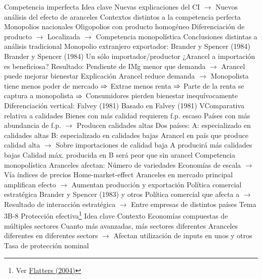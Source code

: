 \documentclass{nuevotema}
\begin{document}
\begin{esquemal}
				\4[] 
		\2 Competencia imperfecta
			\3 Idea clave
				\4 Nuevas explicaciones del CI
				\4[] $\to$ Nuevos análisis del efecto de aranceles
				\4 Contextos distintos a la competencia perfecta
				\4[] Monopolios nacionales
				\4[] Oligopolios con producto homogéneo
				\4[] Diferenciación de producto
				\4[] $\to$ Localizada
				\4[] $\to$ Competencia monopolística
				\4 Conclusiones distintas a análisis tradicional
			\3 Monopolio extranjero exportador: Brander y Spencer (1984)
				\4 Brander y Spencer (1984)
				\4 Un sólo importador/productor
				\4[] ¿Arancel a importación es beneficiosa?
				\4 Resultado:
				\4[] Pendiente de IMg menor que demanda
				\4[] $\to$ Arancel puede mejorar bienestar
				\4 Explicación
				\4[] Arancel reduce demanda
				\4[] $\to$ Monopolista tiene menos poder de mercado
				\4[] $\then$ Extrae menos renta
				\4[] $\then$ Parte de la renta se captura a monopolista
				\4[] $\then$ Consumidores pierden bienestar inequívocamente
			\3 Diferenciación vertical: Falvey (1981)
				\4 Basado en Falvey (1981)
				\4[] VComparativa relativa a calidades
				\4[] Bienes con más calidad requieren f.p. escaso
				\4[] Países con más abundancia de f.p.
				\4[] $\to$ Producen calidades altas
				\4 Dos países:
				\4[] A: especializado en calidades altas
				\4[] B: especializado en calidades bajas
				\4 Arancel en país que produce calidad alta
				\4[] $\to$ Sobre importaciones de calidad baja
				\4[$\then$] A producirá más calidades bajas
				\4[$\then$] Calidad máx. producida en B será peor que sin arancel
				\4 
			\3 Competencia monopolística
				\4 Aranceles afectan:
				\4[] Número de variedades
				\4[] Economías de escala
				\4[] $\to$ Vía índices de precios
				\4 Home-market-effect
				\4[] Aranceles en mercado principal amplifican efecto
				\4[] $\to$ Aumentan producción y exportación
			\3 Política comercial estratégica
				\4 Brander y Spencer (1983) y otros
				\4 Política comercial que afecta a
				\4[] $\to$ Resultado de interacción estratégica
				\4[] $\to$ Entre empresas de distintos países
				\4[$\to$] Tema 3B-8
		\2 Protección efectiva\footnote{Ver \href{http://qed.econ.queensu.ca/faculty/flatters/writings/ff_measuring_impacts_of_trade_policy.pdf}{Flatters (2004)}}
			\3 Idea clave
				\4 Contexto
				\4[] Economías compuestas de múltiples sectores
				\4[] Cuanto más avanzadas, más sectores diferentes
				\4[] Aranceles diferentes en diferentes sectors
				\4[] $\to$ Afectan utilización de inputs en unos y otros
				\4[] Tasa de protección nominal

\end{esquemal}
\end{document}
